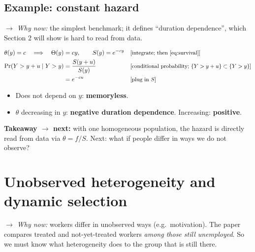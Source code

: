 \documentclass[11pt]{article}
\newcommand{\1}{\mathbf{1}}
\newcommand{\why}[1]{\text{\small[#1]}}
\newcommand{\whynow}[1]{\par\noindent\textit{$\rightarrow$ Why now:} #1\par}
\newcommand{\takeaway}[1]{\par\noindent\textbf{Takeaway $\rightarrow$ next:} #1\par}
\begin{document}
\subsection{Example: constant hazard}
\whynow{the simplest benchmark; it defines ``duration dependence'', which Section 2 will show is hard to read from data.}
\begin{align}
  \theta(y) = c \quad\Longrightarrow\quad \Theta(y) &= cy, \qquad S(y)=e^{-cy} && \why{integrate; then \eqref{eq:survival}} \nonumber\\
  \Pr(Y>y+u \mid Y>y) &= \frac{S(y+u)}{S(y)} && \why{conditional probability; $\{Y>y+u\}\subset\{Y>y\}$} \nonumber\\
  &= e^{-cu} && \why{plug in $S$} \nonumber
\end{align}
\begin{itemize}
  \item Does not depend on $y$: \textbf{memoryless}.
  \item $\theta$ decreasing in $y$: \textbf{negative duration dependence}. Increasing: \textbf{positive}.
\end{itemize}

\takeaway{with one homogeneous population, the hazard is directly read from data via $\theta=f/S$. Next: what if people differ in ways we do not observe?}

\section{Unobserved heterogeneity and dynamic selection}
\whynow{workers differ in unobserved ways (e.g.\ motivation). The paper compares treated and not-yet-treated workers \emph{among those still unemployed}. So we must know what heterogeneity does to the group that is still there.}
\end{document}
